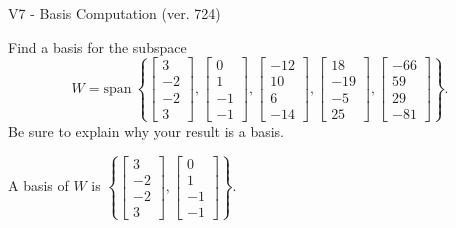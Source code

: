 \begin{exercise}
  \begin{exerciseTitle}V7 - Basis Computation (ver. 724)\end{exerciseTitle}
  \begin{exerciseStatement}
    Find a basis for the subspace 
\[W=\mathrm{span}\ \left\{\left[\begin{array}{r}
3 \\
-2 \\
-2 \\
3
\end{array}\right] , \left[\begin{array}{r}
0 \\
1 \\
-1 \\
-1
\end{array}\right] , \left[\begin{array}{r}
-12 \\
10 \\
6 \\
-14
\end{array}\right] , \left[\begin{array}{r}
18 \\
-19 \\
-5 \\
25
\end{array}\right] , \left[\begin{array}{r}
-66 \\
59 \\
29 \\
-81
\end{array}\right]\right\}.\]
 Be sure to explain why your result is a basis.


  \end{exerciseStatement}
  \begin{exerciseAnswer}
   A basis of \(W\) is  \(\left\{\left[\begin{array}{r}
3 \\
-2 \\
-2 \\
3
\end{array}\right] , \left[\begin{array}{r}
0 \\
1 \\
-1 \\
-1
\end{array}\right]\right\}\).
  


  \end{exerciseAnswer}
\end{exercise}